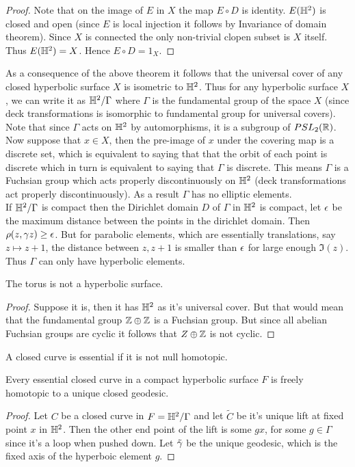 \begin{proof}
  Note that on the image of $E$ in $X$ the map $E\circ D$ is identity. $E(\mathbb{H}^2)$ is closed and open (since $E$ is local injection it follows by Invariance of domain theorem). Since $X$ is connected the only non-trivial clopen subset is $X$ itself. Thus $E(\mathbb{H}^2) = X$. Hence $E\circ D = 1_X$.
\end{proof}

As a consequence of the above theorem it follows that the universal cover of any closed hyperbolic surface $X$ is isometric to $\mathbb{H}^2$. Thus for any hyperbolic surface $X$, we can write it as $\mathbb{H}^2/\Gamma$ where $\Gamma$ is the fundamental group of the space $X$ (since deck transformations is isomorphic to fundamental group for universal covers). Note that since $\Gamma$ acts on $\mathbb{H}^2$ by automorphisms, it is a subgroup of $PSL_2(\mathbb{R})$. Now suppose that $x\in X$, then the pre-image of $x$ under the covering map is a discrete set, which is equivalent to saying that that the orbit of each point is discrete which in turn is equivalent to saying that $\Gamma$ is discrete. This means $\Gamma$ is a Fuchsian group which acts properly discontinuously on $\mathbb{H}^2$ (deck transformations act properly discontinuously). As a result $\Gamma$ has no elliptic elements.\\

If $\mathbb{H}^2/\Gamma$ is compact then the Dirichlet domain $D$ of $\Gamma$ in $\mathbb{H}^2$ is compact, let $\epsilon$ be the maximum distance between the points in the dirichlet domain. Then $\rho(z,\gamma z) \geq \epsilon$. But for parabolic elements, which are essentially translations, say $z\mapsto z+1$, the distance between $z, z+1$ is smaller than $\epsilon$ for large enough $\Im(z)$. Thus $\Gamma$ can only have hyperbolic elements.

\begin{proposition}
  The torus is not a hyperbolic surface.
\end{proposition}
\begin{proof}
  Suppose it is, then it has $\mathbb{H}^2$ as it's universal cover. But that would mean that the fundamental group $\mathbb{Z}\oplus \mathbb{Z}$ is a Fuchsian group. But since all abelian Fuchsian groups are cyclic it follows that $Z\oplus \mathbb{Z}$ is not cyclic.
\end{proof}

\begin{definition}
  A closed curve is essential if it is not null homotopic.
\end{definition}

\begin{proposition}
  Every essential closed curve in a compact hyperbolic surface $F$ is freely homotopic to a unique closed geodesic.
\end{proposition}
\begin{proof}
  Let $C$ be a closed curve in $F = \mathbb{H}^2/\Gamma$ and let $\tilde{C}$ be it's unique lift at fixed point $x$ in $\mathbb{H}^2$. Then the other end point of the lift is some $g x$, for some $g \in \Gamma$ since it's a loop when pushed down. Let $\tilde{\gamma}$ be the unique geodesic, which is the fixed axis of the hyperboic element $g$. 
\end{proof}
